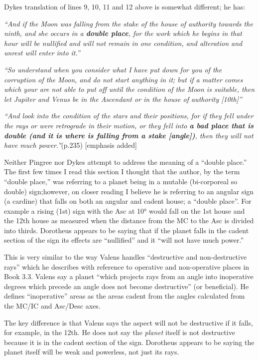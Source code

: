 \begin{mdframed}[backgroundcolor=cyan!5, rightmargin=1em, leftmargin=1em]
Dykes translation of lines 9, 10, 11 and 12 above is somewhat different; he has:

\textsl{``And if the Moon was falling from the stake of the house of authority towards the ninth, and she occurs in a \textbf{double place}, for the work which he begins in that hour will be nullified and will not remain in one condition, and alteration and unrest will enter into it.''}

\textsl{``So understand when you consider what I have put down for you of the corruption of the Moon, and do not start anything in it; but if a matter comes which your are not able to put off until the condition of the Moon is suitable, then let Jupiter and Venus be in the Ascendant or in the house of authority [10th]''}

\textsl{``And look into the condition of the stars and their positions, for if they fell under the rays or were retrograde in their motion, or they fell into \textbf{a bad place that is double (and it is where is falling from a stake [angle])}, then they will not have much power.''}(p.235) [emphasis added]

Neither Pingree nor Dykes attempt to address the meaning of a ``double place.'' The first few times I read this section I thought that the author, by the term ``double place,'' was referring to a planet being in a mutable (bi-corporeal so double) sign;however, on closer reading I believe he is referring to an angular sign (a cardine) that falls on both an angular and cadent house; a ``double place''. For example a rising (1st) sign with the Asc at 10° would fall on the 1st house and the 12th house as measured when the distance from the MC to the Asc is divided into thirds. Dorotheus appears to be saying that if the planet falls in the cadent section of the sign its effects are ``nullified'' and it ``will not have much power.'' 

This is very similar to the way Valens handles ``destructive and non-destructive rays'' which he describes with reference to operative and non-operative places in Book 3.3.  Valens say a planet ``which projects rays from an angle into inoperative degrees which precede an angle does not become destructive'' (or beneficial). He defines ``inoperative'' areas as the areas cadent from the angles calculated from the MC/IC and Asc/Desc axes.

The key difference is that Valens says the aspect will not be destructive if it falls, for example, in the 12th. He does not say the \textsl{planet} itself is not destructive because it is in the cadent section of the sign. Dorotheus appears to be saying the planet itself will be weak and powerless, not just its rays.
\end{mdframed}

